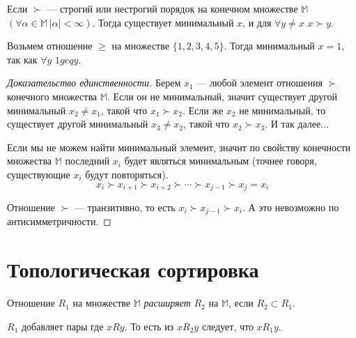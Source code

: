 \documentclass[russian]{lecture-notes}
\begin{document}
	\begin{proposition}
		Если $\succ$ --- строгий или нестрогий порядок на конечном множестве $\mathbb{M}$ $(\forall \alpha \in \mathbb{M}~|\alpha|<\infty)$. Тогда существует минимальный $x$, и для $\forall y \neq x$ \sout{$x \succ y$}.
	\end{proposition}
	\begin{example}
		Возьмем отношение $\geq$ на множестве $\{1, 2, 3, 4, 5\}$. Тогда минимальный $x = 1$, так как $\forall y$ \sout{$1 geq y$}.
	\end{example}
	\begin{proof}[Доказательство единственности]
		Берем $x_1$ --- любой элемент отношения $\succ$ конечного множества $\mathbb{M}$. Если он не минимальный, значит существует другой минимальный $x_2 \neq x_1$, такой что $x_1 \succ x_2$. Если же $x_2$ не минимальный, то существует другой минимальный $x_3 \neq x_2$, такой что $x_2 \succ x_3$. И так далее...
		
		Если мы не можем найти минимальный элемент, значит по свойству конечности множества $\mathbb{M}$ последний $x_i$ будет являться минимальным (точнее говоря, существующие $x_i$ будут повторяться).
		$$x_i \succ x_{i+1} \succ x_{i+2} \succ \cdots \succ x_{j-1} \succ x_j = x_i$$
		
		Отношение $\succ$ --- транзитивно, то есть $x_i \succ x_{j-1} \succ x_i$. А это невозможно по антисимметричности.
	\end{proof}

	\section{Топологическая сортировка}
	\begin{definition}
		Отношение $R_1$ на множестве $\mathbb{M}$ \textit{расширяет} $R_2$ на $\mathbb{M}$, если $R_2 \subset R_1$.
	\end{definition}
	\begin{remark}
		$R_1$ добавляет пары где $xRy$. То есть из $xR_2y$ следует, что $xR_1y$.
	\end{remark}
	
\end{document}
